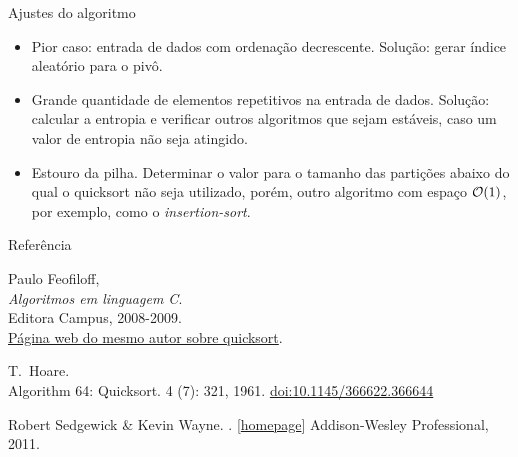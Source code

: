 \begin{frame}{Ajustes do algoritmo}
  \begin{itemize}
  \item Pior caso: entrada de dados com ordenação decrescente. Solução:
    gerar índice aleatório para o pivô.
  \item Grande quantidade de elementos repetitivos na entrada de
    dados. Solução: calcular a entropia e verificar outros algoritmos que
    sejam estáveis, caso um valor de entropia não seja atingido.
  \item Estouro da pilha. Determinar o valor para o tamanho das
    partições abaixo do qual o quicksort não seja utilizado, porém, outro
    algoritmo com espaço $\mathcal{O}(1)$, por exemplo, como o {\em insertion-sort}.
  \end{itemize}
\end{frame}

\begin{frame}{Referência}
  \begin{thebibliography}{9}
   Paulo Feofiloff, \\
    {\em Algoritmos em linguagem C}.\\
    Editora Campus, 2008-2009.\\
    \href{http://www.ime.usp.br/~pf/algoritmos/aulas/quick.html}{Página web do mesmo autor sobre quicksort}.

    T.~Hoare.\\
    \newblock Algorithm 64: Quicksort. 
     4 (7): 321, 1961.
    \newblock \href{http://dx.doi.org/10.1145\%2F366622.366644}{doi:10.1145/366622.366644}

    Robert Sedgewick \& Kevin Wayne.
    . [\href{http://algs4.cs.princeton.edu/home/}{\color{blue}homepage}]
    \newblock Addison-Wesley Professional, 2011.
  \end{thebibliography} 

\end{frame}



